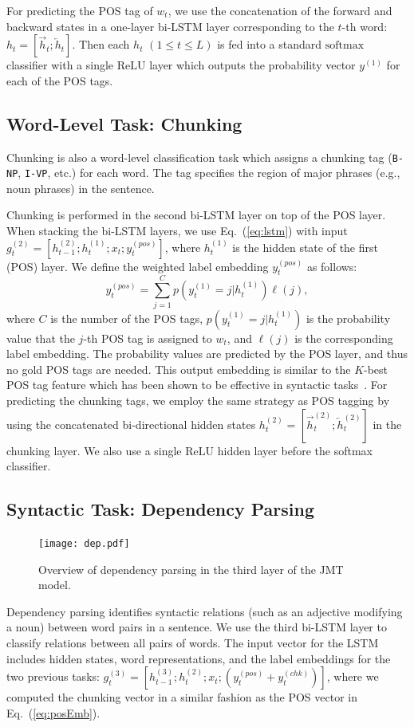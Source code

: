\documentclass[11pt,a4paper]{article}
\begin{document}
For predicting the POS tag of $w_t$, we use the concatenation of the forward and backward states in a one-layer bi-LSTM layer corresponding to the $t$-th word: $h_{t} = [\overrightarrow{h}_{t}; \overleftarrow{h}_{t}]$.
Then each $h_{t}$ $(1\leq t \leq L)$ is fed into a standard $\mathrm{softmax}$ classifier with a single $\mathrm{ReLU}$ layer which outputs the probability vector $y^{(1)}$ for each of the POS tags.

\subsection{Word-Level Task: Chunking}

Chunking is also a word-level classification task which assigns a chunking tag ({\tt B-NP}, {\tt I-VP}, etc.) for each word. The tag specifies the region of major phrases (e.g., noun phrases) in the sentence.

Chunking is performed in the second bi-LSTM layer on top of the POS layer. 
When stacking the bi-LSTM layers, we use Eq.~(\ref{eq:lstm}) with input $g^{(2)}_t = [h^{(2)}_{t-1}; h^{(1)}_{t}; x_t; y_t^{(pos)}]$, where $h^{(1)}_{t}$ is the hidden state of the first (POS) layer.
We define the weighted label embedding $y_t^{(pos)}$ as follows:
\begin{equation}\label{eq:posEmb}
y_t^{(pos)} = \sum_{j=1}^{C}p(y^{(1)}_t=j|h_t^{(1)})\ell(j),
\end{equation}
where $C$ is the number of the POS tags, $p(y^{(1)}_t=j|h_t^{(1)})$ is the probability value that the $j$-th POS tag is assigned to $w_t$, and $\ell(j)$ is the corresponding label embedding.
The probability values are predicted by the POS layer, and thus no gold POS tags are needed.
This output embedding is similar to the $K$-best POS tag feature which has been shown to be effective in syntactic tasks~\citep{andor2016,alberti2016}.
For predicting the chunking tags, we employ the same strategy as POS tagging by using the concatenated bi-directional hidden states $h^{(2)}_{t} = [\overrightarrow{h}^{(2)}_{t}; \overleftarrow{h}^{(2)}_{t}]$ in the chunking layer. 
We also use a single $\mathrm{ReLU}$ hidden layer before the softmax classifier.


\subsection{Syntactic Task: Dependency Parsing}
\begin{figure}[t]
	\begin{center}
    	\texttt{[image: dep.pdf]}
    \end{center}
\label{fig5}
\caption{Overview of dependency parsing in the third layer of the JMT model.}
\end{figure}
\fi
Dependency parsing identifies syntactic relations (such as an adjective modifying a noun) between word pairs in a sentence.
We use the third bi-LSTM layer to classify relations between all pairs of words.
The input vector for the LSTM includes hidden states, word representations, and the label embeddings for the two previous tasks:
$g^{(3)}_t = [h^{(3)}_{t-1}; h^{(2)}_{t}; x_t; (y_t^{(pos)} + y_t^{(chk)})]$, where we computed the chunking vector in a similar fashion as the POS vector in Eq.~(\ref{eq:posEmb}).
\end{document}

